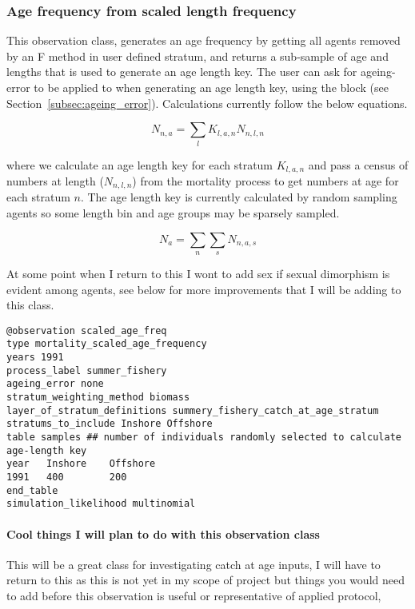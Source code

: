 \subsubsection{Age frequency from scaled length frequency}\label{subsubsec:Mortalitysubsamle}
This observation class, generates an age frequency by getting all agents removed by an F method in user defined stratum, and returns a sub-sample of age and lengths that is used to generate an age length key. The user can ask for ageing-error to be applied to when generating an age length key, using the   block (see Section~\ref{subsec:ageing_error}). Calculations currently follow the below equations.  

\begin{equation}
N_{n,a} = \sum_l K_{l,a,n} N_{n,l,n}
\end{equation}

where we calculate an age length key for each stratum $K_{l,a,n}$ and pass a census of numbers at length ($N_{n,l,n}$) from the mortality process to get numbers at age for each stratum $n$. The age length key is currently calculated by random sampling agents so some length bin and age groups may be sparsely sampled.

\begin{equation}
N_{a} = \sum_n \sum_s N_{n,a,s}
\end{equation}

At some point when I return to this I wont to add sex if sexual dimorphism is evident among agents, see below for more improvements that I will be adding to this class.

{\small{\begin{verbatim}
@observation scaled_age_freq
type mortality_scaled_age_frequency
years 1991
process_label summer_fishery
ageing_error none
stratum_weighting_method biomass
layer_of_stratum_definitions summery_fishery_catch_at_age_stratum
stratums_to_include Inshore Offshore
table samples ## number of individuals randomly selected to calculate age-length key
year   Inshore    Offshore
1991   400        200
end_table
simulation_likelihood multinomial
\end{verbatim}}}


\paragraph*{Cool things I will plan to do with this observation class}
This will be a great class for investigating catch at age inputs, I will have to return to this as this is not yet in my scope of project but things you would need to add before this observation is useful or representative of applied protocol,

